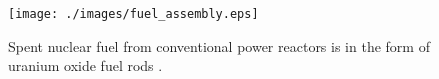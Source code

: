 \begin{figure}[htb!]
  \begin{center}
    \texttt{[image: ./images/fuel\_assembly.eps]}
  \end{center}
  \caption{Spent nuclear fuel from conventional power reactors is in the form of
    uranium oxide fuel rods \cite{nrc_nuclear-fuel.jpg_nodate}.}
  \label{fig:snf}
\end{figure}
